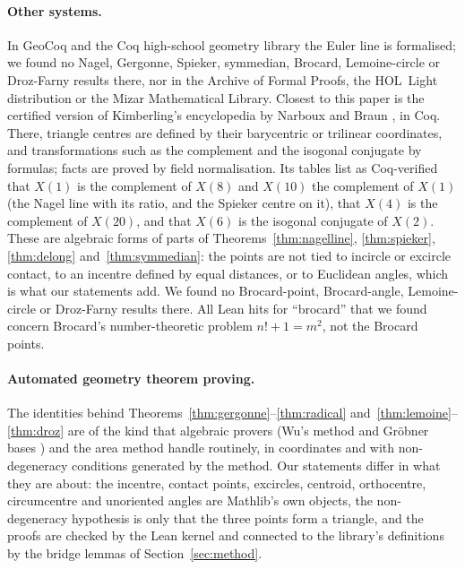 \documentclass[11pt]{article}
\theoremstyle{definition}
\theoremstyle{remark}
\begin{document}
\paragraph{Other systems.} In GeoCoq and the Coq high-school geometry library the Euler line is
formalised; we found no Nagel, Gergonne, Spieker, symmedian, Brocard, Lemoine-circle or Droz-Farny
results there, nor in the Archive of Formal Proofs, the HOL~Light distribution or the Mizar
Mathematical Library. Closest to this paper is the certified version of Kimberling's encyclopedia
by Narboux and Braun \cite{certifiedetc}, in Coq. There, triangle centres are defined by their
barycentric or trilinear coordinates, and transformations such as the complement and the isogonal
conjugate by formulas; facts are proved by field normalisation. Its tables list as Coq-verified that
$X(1)$ is the complement of $X(8)$ and $X(10)$ the complement of $X(1)$ (the Nagel line with its
ratio, and the Spieker centre on it), that $X(4)$ is the complement of $X(20)$, and that $X(6)$ is the
isogonal conjugate of $X(2)$. These are algebraic forms of parts of Theorems~\ref{thm:nagelline},
\ref{thm:spieker}, \ref{thm:delong} and~\ref{thm:symmedian}: the points are not tied to incircle or
excircle contact, to an incentre defined by equal distances, or to Euclidean angles, which is what
our statements add. We found no Brocard-point, Brocard-angle, Lemoine-circle or Droz-Farny results
there. All Lean hits for ``brocard'' that we found concern Brocard's number-theoretic
problem $n!+1=m^2$, not the Brocard points.

\paragraph{Automated geometry theorem proving.} The identities behind Theorems~\ref{thm:gergonne}--\ref{thm:radical}
and~\ref{thm:lemoine}--\ref{thm:droz} are of the kind that algebraic provers (Wu's method and Gr\"obner
bases \cite{chou1987}) and the area method \cite{chougaozhang} handle routinely, in coordinates and with
non-degeneracy conditions generated by the method. Our statements differ in what they are about: the
incentre, contact points, excircles, centroid, orthocentre, circumcentre and unoriented angles are
Mathlib's own objects, the non-degeneracy hypothesis is only that the three points form a triangle,
and the proofs are checked by the Lean kernel and connected to the library's definitions by the
bridge lemmas of Section~\ref{sec:method}.
\end{document}
